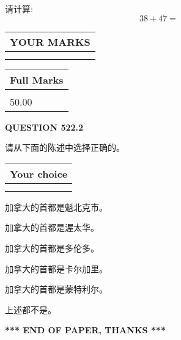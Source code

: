 \documentclass{ctexart}
\begin{document}
  
 
请计算:
\begin{equation}
38 +  %
47 = \nonumber
\end{equation}
 

 

 
  
\vspace{0.2in}
  
\noindent\begin{tabular}{|l|}
\hline
 YOUR MARKS  \\
\hline
 \\ 
 \\ 
\hline
\end{tabular}
\hspace{0.05in} \begin{tabular}{|l|}
\hline
 Full Marks  \\
\hline
 \\ 
50.00 \\
\hline
\end{tabular}
{\textbf{\Large{QUESTION
522.2 
}}}
  
  
请从下面的陈述中选择正确的。
  
  
\noindent\hspace{3.0in} \begin{tabular}{|l|}
\hline
Your choice \\
\hline
 \\ 
 \\ 
\hline
\end{tabular}
  
  
 
 
加拿大的首都是魁北克市。
 
 
加拿大的首都是渥太华。
 
 
加拿大的首都是多伦多。
 
 
加拿大的首都是卡尔加里。
 
 
加拿大的首都是蒙特利尔。
 
 
 上述都不是。
 
 
   
   
 \vspace{0.2in}
 
   
   
   
   
\vspace{1.0in} 
{\textbf{\large{ *** END OF PAPER, THANKS *** }}} 
   
\end{document}
